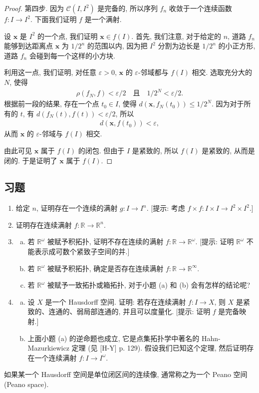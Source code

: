 \documentclass[../../main.tex]{subfiles}
\begin{document}
\begin{proof}
第四步. 因为 $\mathcal{C}(I,I^2)$ 是完备的, 所以序列 $f_n$ 收敛于一个连续函数 $f\colon I\to I^2$. 下面我们证明 $f$ 是一个满射.

设 $\mathbf{x}$ 是 $I^2$ 的一个点, 我们证明 $\mathbf{x}\in f(I)$. 首先, 我们注意, 对于给定的 $n$, 道路 $f_n$ 能够到达距离点 $\mathbf{x}$ 为 $1/2^n$ 的范围以内, 因为把 $I^2$ 分割为边长是 $1/2^n$ 的小正方形, 道路 $f_n$ 会碰到每一个这样的小方块.

利用这一点, 我们证明, 对任意 $\varepsilon>0$, $\mathbf{x}$ 的 $\varepsilon$-邻域都与 $f(I)$ 相交. 选取充分大的 $N$, 使得
\begin{align*}
\rho(f_N,f)<\varepsilon/2\quad\text{且}\quad 1/2^N<\varepsilon/2.
\end{align*}
根据前一段的结果, 存在一个点 $t_0\in I$, 使得 $d(\mathbf{x},f_N(t_0))\leqslant 1/2^N$. 因为对于所有的 $t$, 有 $d(f_N(t),f(t))<\varepsilon/2$, 所以
\begin{align*}
d(\mathbf{x},f(t_0))<\varepsilon,
\end{align*}
从而 $\mathbf{x}$ 的 $\varepsilon$-邻域与 $f(I)$ 相交.

由此可见 $\mathbf{x}$ 属于 $f(I)$ 的闭包. 但由于 $I$ 是紧致的, 所以 $f(I)$ 是紧致的, 从而是闭的. 于是证明了 $\mathbf{x}$ 属于 $f(I)$.
\end{proof}

\subsection*{习题}

\begin{enumerate}
\item 给定 $n$, 证明存在一个连续的满射 $g\colon I\to I^n$. [提示: 考虑 $f\times f\colon I\times I\to I^2\times I^2$.]
\item 证明存在连续满射 $f\colon\mathbb{R}\to\mathbb{R}^n$.
\item 
\begin{enumerate}[(a)]
\item 若 $\mathbb{R}^\omega$ 被赋予积拓扑, 证明不存在连续的满射 $f\colon\mathbb{R}\to\mathbb{R}^\omega$. [提示: 证明 $\mathbb{R}^\omega$ 不能表示成可数个紧致子空间的并.]
\item 若 $\mathbb{R}^\omega$ 被赋予积拓扑, 确定是否存在连续满射 $f\colon\mathbb{R}\to\mathbb{R}^\infty$.
\item 若 $\mathbb{R}^\omega$ 被赋予一致拓扑或箱拓扑, 对于小题 (a) 和 (b) 会有怎样的结论呢?
\end{enumerate}
\item
\begin{enumerate}[(a)]
\item 设 $X$ 是一个 Hausdorff 空间. 证明: 若存在连续满射 $f\colon I\to X$, 则 $X$ 是紧致的、连通的、弱局部连通的, 并且可以度量化. [提示: 证明 $f$ 是完备映射.]
\item 上面小题 (a) 的逆命题也成立, 它是点集拓扑学中著名的 Hahn-Mazurkiewicz 定理 (见 [H-Y] p. 129). 假设我们已知这个定理, 然后证明存在一个连续满射 $f\colon I\to I^\omega$.
\end{enumerate}
\end{enumerate}

如果某一个 Hausdorff 空间是单位闭区间的连续像, 通常称之为一个 Peano 空间(Peano space).
\end{document}
